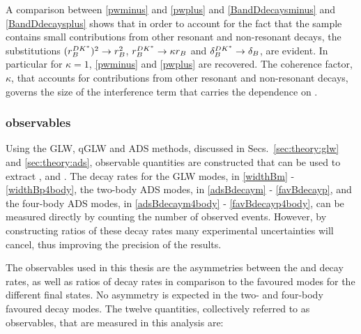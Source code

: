 A comparison between \eqns\ref{pwminus} and \ref{pwplus} and \eqns\ref{BandDdecaysminus} and \ref{BandDdecaysplus} shows that in order to account for the fact that the \decay{\Bm}{\D\Kstarm} sample contains small contributions from other resonant and non-resonant \decay{\Bm}{\D\KS\pim} decays, the substitutions $(r_B^{DK^*})^2 \rightarrow r_B^2$, $r_B^{DK^*} \rightarrow \kappa r_B$ and $\delta_B^{DK^*} \rightarrow \delta_B$, are evident. In particular for $\kappa = 1$, \eqns\ref{pwminus} and \ref{pwplus} are recovered. The coherence factor, $\kappa$, that accounts for contributions from other resonant and non-resonant \decay{\Bm}{\D\KS\pim} decays, governs the size of the interference term that carries the dependence on \Pgamma.

\subsubsection{\CP observables}
\label{sec:theory:observables}

Using the GLW, qGLW and ADS methods, discussed in Secs.~\ref{sec:theory:glw} and \ref{sec:theory:ads}, observable quantities are constructed that can be used to extract \rb, \deltab and \Pgamma. The decay rates for the GLW modes, in \eqns\ref{widthBm} - \ref{widthBp4body}, the two-body ADS modes, in \eqns\ref{adsBdecaym} - \ref{favBdecayp}, and the four-body ADS modes, in \eqns\ref{adsBdecaym4body} - \ref{favBdecayp4body}, can be measured directly by counting the number of observed events. However, by constructing ratios of these decay rates many experimental uncertainties will cancel, thus improving the precision of the results. 

The observables used in this thesis are the asymmetries between the \Bm and \Bp decay rates, as well as ratios of decay rates in comparison to the favoured modes for the different \Dz final states. No \CP asymmetry is expected in the two- and four-body favoured \Dz decay modes. The twelve quantities, collectively referred to as \CP observables, that are measured in this analysis are:

